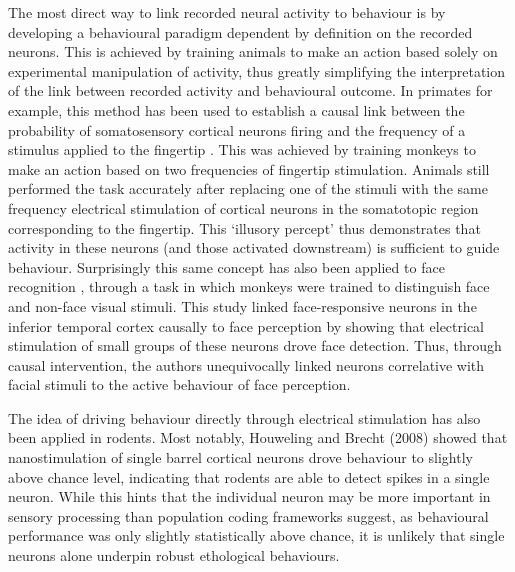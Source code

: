 The most direct way to link recorded neural activity to behaviour is by developing a behavioural paradigm dependent by definition on the recorded neurons. This is achieved by training animals to make an action based solely on experimental manipulation of activity, thus greatly simplifying the interpretation of the link between recorded activity and behavioural outcome. In primates for example, this method has been used to establish a causal link between the probability of somatosensory cortical neurons firing and the frequency of a stimulus applied to the fingertip \cite{romo_somatosensory_1998}. This was achieved by training monkeys to make an action based on two frequencies of fingertip stimulation. Animals still performed the task accurately after replacing one of the stimuli with the same frequency electrical stimulation of cortical neurons in the somatotopic region corresponding to the fingertip. This ‘illusory percept’ thus demonstrates that activity in these neurons (and those activated downstream) is sufficient to guide behaviour. Surprisingly this same concept has also been applied to face recognition \cite{afraz_microstimulation_2006}, through a task in which monkeys were trained to distinguish face and non-face visual stimuli. This study linked face-responsive neurons in the inferior temporal cortex causally to face perception by showing that electrical stimulation of small groups of these neurons drove face detection. Thus, through causal intervention, the authors unequivocally linked neurons correlative with facial stimuli to the active behaviour of face perception.

The idea of driving behaviour directly through electrical stimulation has also been applied in rodents. Most notably, Houweling and Brecht (2008) \cite{houweling_behavioural_2008} showed that nanostimulation of single barrel cortical neurons drove behaviour to slightly above chance level, indicating that rodents are able to detect spikes in a single neuron. While this hints that the individual neuron may be more important in sensory processing than population coding frameworks \cite{averbeck_neural_2006} suggest, as behavioural performance was only slightly statistically above chance, it is unlikely that single neurons alone underpin robust ethological behaviours.

